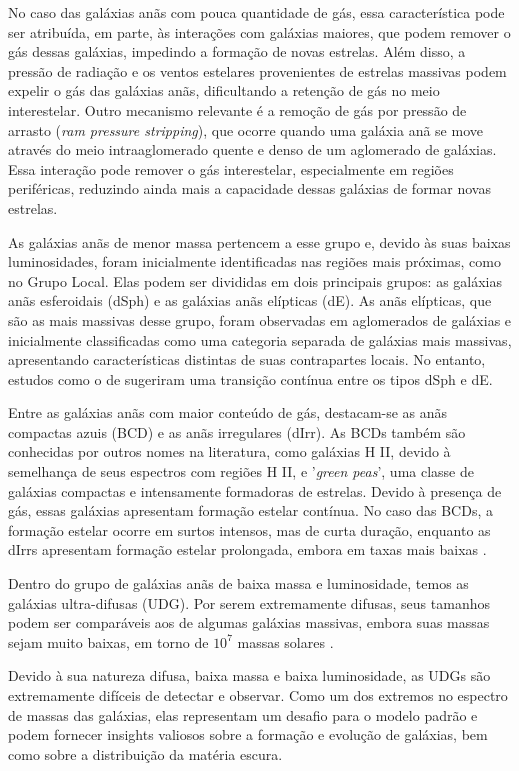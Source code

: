 No caso das galáxias anãs com pouca quantidade de gás, essa característica pode ser atribuída, em parte, às interações com galáxias maiores, que podem remover o gás dessas galáxias, impedindo a formação de novas estrelas. Além disso, a pressão de radiação e os ventos estelares provenientes de estrelas massivas podem expelir o gás das galáxias anãs, dificultando a retenção de gás no meio interestelar. Outro mecanismo relevante é a remoção de gás por pressão de arrasto (\textit{ram pressure stripping}), que ocorre quando uma galáxia anã se move através do meio intraaglomerado quente e denso de um aglomerado de galáxias. Essa interação pode remover o gás interestelar, especialmente em regiões periféricas, reduzindo ainda mais a capacidade dessas galáxias de formar novas estrelas.

As galáxias anãs de menor massa pertencem a esse grupo e, devido às suas baixas luminosidades, foram inicialmente identificadas nas regiões mais próximas, como no Grupo Local. Elas podem ser divididas em dois principais grupos: as galáxias anãs esferoidais (\ac{dSph}) e as galáxias anãs elípticas (\ac{dE}). As anãs elípticas, que são as mais massivas desse grupo, foram observadas em aglomerados de galáxias e inicialmente classificadas como uma categoria separada de galáxias mais massivas, apresentando características distintas de suas contrapartes locais. No entanto, estudos como o de \cite{Forbes_2011} sugeriram uma transição contínua entre os tipos \ac{dSph} e \ac{dE}.

Entre as galáxias anãs com maior conteúdo de gás, destacam-se as anãs compactas azuis (\ac{BCD}) e as anãs irregulares (\ac{dIrr}). As BCDs também são conhecidas por outros nomes na literatura, como galáxias H II, devido à semelhança de seus espectros com regiões H II, e '\textit{green peas}', uma classe de galáxias compactas e intensamente formadoras de estrelas. Devido à presença de gás, essas galáxias apresentam formação estelar contínua. No caso das BCDs, a formação estelar ocorre em surtos intensos, mas de curta duração, enquanto as dIrrs apresentam formação estelar prolongada, embora em taxas mais baixas \citep{McQuinn2010}.

Dentro do grupo de galáxias anãs de baixa massa e luminosidade, temos as galáxias ultra-difusas (UDG). Por serem extremamente difusas, seus tamanhos podem ser comparáveis aos de algumas galáxias massivas, embora suas massas sejam muito baixas, em torno de $10^7$ massas solares \citep{van_Dokkum2015}.

Devido à sua natureza difusa, baixa massa e baixa luminosidade, as UDGs são extremamente difíceis de detectar e observar. Como um dos extremos no espectro de massas das galáxias, elas representam um desafio para o modelo padrão e podem fornecer insights valiosos sobre a formação e evolução de galáxias, bem como sobre a distribuição da matéria escura.

